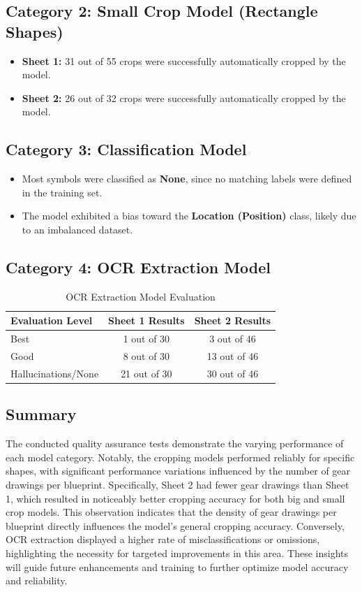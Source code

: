 \documentclass[11pt,a4paper]{article}
\begin{document}
\subsection{Category 2: Small Crop Model (Rectangle Shapes)}
\begin{itemize}
  \item \textbf{Sheet 1:} 31 out of 55 crops were successfully automatically cropped by the model.
  \item \textbf{Sheet 2:} 26 out of 32 crops were successfully automatically cropped by the model.
\end{itemize}

\subsection{Category 3: Classification Model}
\begin{itemize}
  \item Most symbols were classified as \textbf{None}, since no matching labels were defined in the training set.
  \item The model exhibited a bias toward the \textbf{Location (Position)} class, likely due to an imbalanced dataset.
\end{itemize}

\subsection{Category 4: OCR Extraction Model}
\begin{table}[h!]
\centering
\begin{tabular}{|l|c|c|}
\hline
\textbf{Evaluation Level} & \textbf{Sheet 1 Results} & \textbf{Sheet 2 Results} \\
\hline
Best & 1 out of 30 & 3 out of 46 \\
\hline
Good & 8 out of 30 & 13 out of 46 \\
\hline
Hallucinations/None & 21 out of 30 & 30 out of 46 \\
\hline
\end{tabular}
\caption{OCR Extraction Model Evaluation}
\label{tab:ocr_evaluation}
\end{table}

\subsection*{Summary}
The conducted quality assurance tests demonstrate the varying performance of each model category. Notably, the cropping models performed reliably for specific shapes, with significant performance variations influenced by the number of gear drawings per blueprint. Specifically, Sheet 2 had fewer gear drawings than Sheet 1, which resulted in noticeably better cropping accuracy for both big and small crop models. This observation indicates that the density of gear drawings per blueprint directly influences the model's general cropping accuracy. Conversely, OCR extraction displayed a higher rate of misclassifications or omissions, highlighting the necessity for targeted improvements in this area. These insights will guide future enhancements and training to further optimize model accuracy and reliability.
\end{document}
